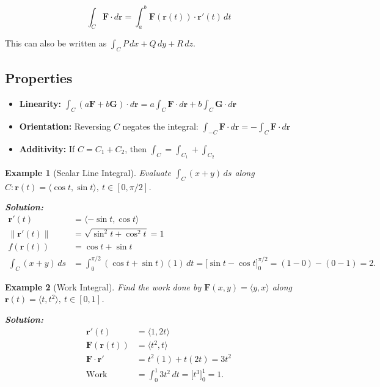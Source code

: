 \documentclass[12pt]{article}
\newtheorem{example}{Example}[section]
\begin{document}
\[
\boxed{\int_C \mathbf{F}\cdot d\mathbf{r} = \int_a^b \mathbf{F}(\mathbf{r}(t))\cdot \mathbf{r}'(t)\,dt}
\]

This can also be written as \(\int_C P\,dx + Q\,dy + R\,dz\).

\subsection{Properties}
\begin{itemize}
    \item \textbf{Linearity:} \(\int_C (a\mathbf{F}+b\mathbf{G})\cdot d\mathbf{r} = a\int_C \mathbf{F}\cdot d\mathbf{r} + b\int_C \mathbf{G}\cdot d\mathbf{r}\)
    \item \textbf{Orientation:} Reversing \(C\) negates the integral: \(\int_{-C} \mathbf{F}\cdot d\mathbf{r} = -\int_C \mathbf{F}\cdot d\mathbf{r}\)
    \item \textbf{Additivity:} If \(C = C_1 + C_2\), then \(\int_C = \int_{C_1} + \int_{C_2}\)
\end{itemize}

\begin{example}[Scalar Line Integral]
Evaluate \(\int_C (x+y)\,ds\) along \(C: \mathbf{r}(t)=\langle\cos t,\sin t\rangle,\ t\in[0,\pi/2]\).

\textbf{Solution:}
\begin{align*}
\mathbf{r}'(t) &= \langle -\sin t,\cos t\rangle \\
\|\mathbf{r}'(t)\| &= \sqrt{\sin^2 t + \cos^2 t} = 1 \\
f(\mathbf{r}(t)) &= \cos t + \sin t \\
\int_C (x+y)\,ds &= \int_0^{\pi/2} (\cos t+\sin t)(1)\,dt = \bigl[\sin t - \cos t\bigr]_0^{\pi/2} = (1-0)-(0-1)=2.
\end{align*}
\end{example}

\begin{example}[Work Integral]
Find the work done by \(\mathbf{F}(x,y)=\langle y, x\rangle\) along \(\mathbf{r}(t)=\langle t,t^2\rangle,\ t\in[0,1]\).

\textbf{Solution:}
\begin{align*}
\mathbf{r}'(t) &= \langle 1, 2t\rangle \\
\mathbf{F}(\mathbf{r}(t)) &= \langle t^2, t\rangle \\
\mathbf{F}\cdot\mathbf{r}' &= t^2(1) + t(2t) = 3t^2 \\
\text{Work} &= \int_0^1 3t^2\,dt = \bigl[t^3\bigr]_0^1 = 1.
\end{align*}
\end{example}
\end{document}
